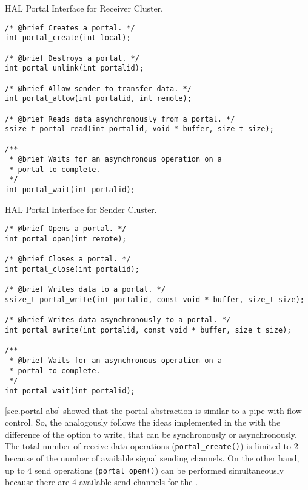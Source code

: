 \begin{listing}[!tb]
\caption{HAL Portal Interface for Receiver Cluster.}
\label{code:portal-receiver}
\begin{verbatim}
/* @brief Creates a portal. */
int portal_create(int local);

/* @brief Destroys a portal. */
int portal_unlink(int portalid);

/* @brief Allow sender to transfer data. */
int portal_allow(int portalid, int remote);

/* @brief Reads data asynchronously from a portal. */
ssize_t portal_read(int portalid, void * buffer, size_t size);

/**
 * @brief Waits for an asynchronous operation on a
 * portal to complete.
 */
int portal_wait(int portalid);
\end{verbatim}
\end{listing}

\begin{listing}[!tb]
\caption{HAL Portal Interface for Sender Cluster.}
\label{code:portal-sender}
\begin{verbatim}
/* @brief Opens a portal. */
int portal_open(int remote);

/* @brief Closes a portal. */
int portal_close(int portalid);

/* @brief Writes data to a portal. */
ssize_t portal_write(int portalid, const void * buffer, size_t size);

/* @brief Writes data asynchronously to a portal. */
int portal_awrite(int portalid, const void * buffer, size_t size);

/**
 * @brief Waits for an asynchronous operation on a
 * portal to complete.
 */
int portal_wait(int portalid);
\end{verbatim}
\end{listing}

				\autoref{sec.portal-abs} showed that the portal abstraction is similar to
				a \posix pipe with flow control.
				So, the \portal analogously follows the ideas implemented
				in the \mailbox with the difference of the option to write,
				that can be synchronously or asynchronously.
				The total number of receive data operations (\texttt{portal\_create()})
				is limited to 2 because of the number of available signal sending channels.
				On the other hand, up to 4 send operations (\texttt{portal\_open()})
				can be performed simultaneously because there are 4 available send
				channels for the \portal.

